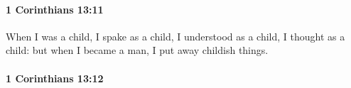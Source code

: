 		\paragraph{1 Corinthians 13:11} %
			\label{1CORINTHIANS-13-11}

			When I was a child, I spake as a child, I understood as a child, I thought as a child: but when I became a man, I put away childish things.

			\begin{framed}
				\scriptsize
				\begin{compactdesc}
					\item[SBLG] 
				\end{compactdesc}
			\end{framed}

		\paragraph{1 Corinthians 13:12} %
			\label{1CORINTHIANS-13-12}

